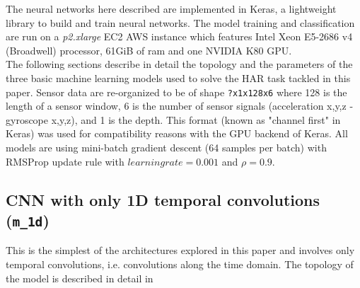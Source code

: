 The neural networks here described are implemented in Keras, a lightweight library to build and train neural networks. The model training and classification are run on a {\it p2.xlarge} EC2 AWS instance which features Intel Xeon E5-2686 v4 (Broadwell) processor, 61GiB of ram and one NVIDIA K80 GPU. \\
The following sections describe in detail the topology and the parameters of the three basic machine learning models used to solve the HAR task tackled in this paper.
Sensor data are \mbox{re-organized} to be of shape \texttt{?x1x128x6} where 128 is the length of a sensor window, 6 is the number of sensor signals (acceleration x,y,z - gyroscope x,y,z), and 1 is the depth. This format (known as "channel first" in Keras) was used for compatibility reasons with the GPU backend of Keras. All models are using mini-batch gradient descent (64 samples per batch) with RMSProp update rule with $ learningrate=0.001$ and $\rho=0.9$.

\subsection{CNN with only 1D temporal convolutions (\texttt{m_1d})}
\label{sec:m_1d}
This is the simplest of the architectures explored in this paper and involves only temporal convolutions, i.e. convolutions along the time domain. The topology of the model is described in detail in 

\begin{table}[!htbp]
\captionsetup{font=scriptsize, justification=centering}
\centering
{}
\caption{\texttt{m_1d} model representation. Each \texttt{Conv} layer is made of (i) a convolution layer, (ii) a batch normalization and (iii) a ReLU activation. \texttt{D.M.} stands for dropout and max pooling, \texttt{D} stands for dropout. All dropout layers were set to 0.3 except the last one, set to 0.2.}
\label{m_1d_table}
\end{table}

